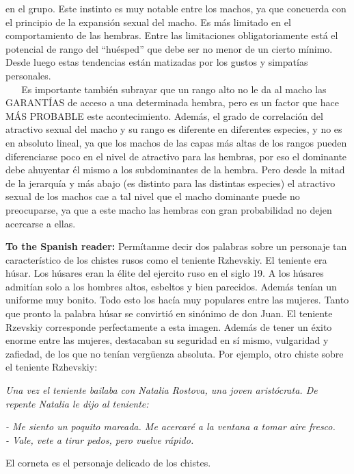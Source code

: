 en el grupo. Este instinto es muy notable entre los machos, ya que
concuerda con el principio de la expansión sexual del macho. Es más
limitado en el comportamiento de las hembras. Entre las limitaciones
obligatoriamente está el potencial de rango del ``huésped'' que debe ser
no menor de un cierto mínimo. Desde luego estas tendencias están
matizadas por los gustos y simpatías personales.\\
\hspace*{0.333em} ~ ~ Es importante también subrayar que un rango alto
no le da al macho las GARANTÍAS de acceso a una determinada hembra, pero
es un factor que hace MÁS PROBABLE este acontecimiento. Además, el grado
de correlación del atractivo sexual del macho y su rango es diferente en
diferentes especies, y no es en absoluto lineal, ya que los machos de
las capas más altas de los rangos pueden diferenciarse poco en el nivel
de atractivo para las hembras, por eso el dominante debe ahuyentar él
mismo a los subdominantes de la hembra. Pero desde la mitad de la
jerarquía y más abajo (es distinto para las distintas especies) el
atractivo sexual de los machos cae a tal nivel que el macho dominante
puede no preocuparse, ya que a este macho las hembras con gran
probabilidad no dejen acercarse a ellas.\\

\begin{tcolorbox}[breakable]
 \textbf{To the Spanish reader:} Permítanme decir dos palabras sobre un   personaje tan característico de los chistes rusos como el teniente   Rzhevskiy. El teniente era húsar. Los húsares eran la élite del   ejercito ruso en el siglo 19. A los húsares admitían solo a los   hombres altos, esbeltos y bien parecidos. Además tenían un uniforme   muy bonito. Todo esto los hacía muy populares entre las mujeres.   Tanto que pronto la palabra húsar se convirtió en sinónimo de don   Juan. El teniente Rzevskiy corresponde perfectamente a esta imagen.   Además de tener un éxito enorme entre las mujeres, destacaban su   seguridad en sí mismo, vulgaridad y zafiedad, de los que no tenían   vergüenza absoluta. Por ejemplo, otro chiste sobre el teniente Rzhevskiy:    
 
 \textit{Una vez el teniente bailaba con Natalia Rostova, una joven aristócrata. De repente Natalia le dijo al teniente:}     

\noindent
\textit{- Me siento un poquito mareada. Me acercaré a la ventana a tomar aire fresco.}\\
\textit{- Vale, vete a tirar pedos, pero vuelve rápido.} 

\smallskip
El corneta es el personaje delicado de los chistes. 
\end{tcolorbox}

